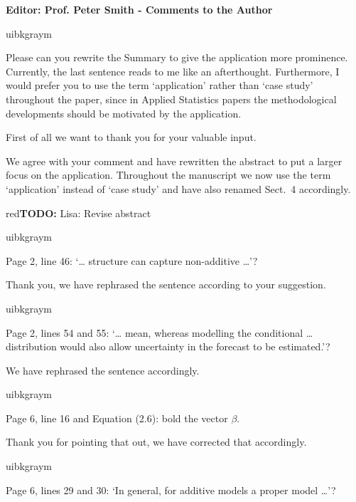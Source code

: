 \documentclass[english, noconfig]{uibklttr}
\newcommand{\section}[1]{{\Large{\textbf{#1}}}}
\newenvironment{re}{
    \begin{color}{uibkgraym}
        \itshape
}{
    \end{color}
}
\newcommand{\todo}[1]{
    \begin{color}{red}\textbf{TODO:} #1\end{color}%
}
\begin{document}
\newpage

\section{Editor: Prof. Peter Smith - Comments to the Author}

\begin{re}
Please can you rewrite the Summary to give the application more prominence.
Currently, the last sentence reads to me like an afterthought. Furthermore, I
would prefer you to use the term `application' rather than `case study'
throughout the paper, since in Applied Statistics papers the methodological
developments should be motivated by the application.
\end{re}

\vspace{-1em}
First of all we want to thank you for your valuable input. 

We agree with your comment and have rewritten the abstract to put a larger
focus on the application. Throughout the manuscript we now use the term
`application' instead of `case study' and have also renamed Sect.~4
accordingly. \todo{Lisa: Revise abstract}

\vspace{0.5em}
\begin{re}
Page 2, line 46: `… structure can capture non-additive …'?
\end{re}

Thank you, we have rephrased the sentence according to your suggestion.

\vspace{0.5em}
\begin{re}
Page 2, lines 54 and 55: `… mean, whereas modelling the conditional …
distribution would also allow uncertainty in the forecast to be estimated.'?
\end{re}

We have rephrased the sentence accordingly.

\vspace{0.5em}
\begin{re}
Page 6, line 16 and Equation (2.6): bold the vector $\beta$.
\end{re}

Thank you for pointing that out, we have corrected that accordingly.

\vspace{0.5em}
\begin{re}
Page 6, lines 29 and 30: `In general, for additive models a proper model …'?
\end{re}
\end{document}
